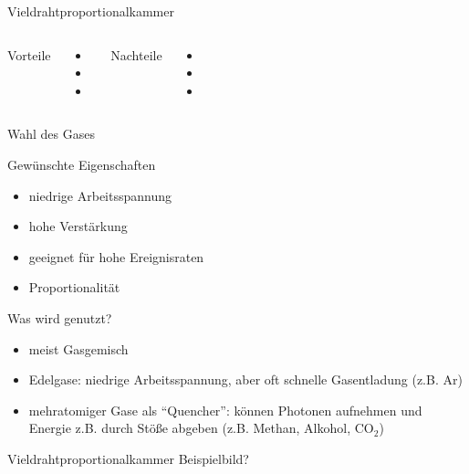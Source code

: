 \begin{frame}{Vieldrahtproportionalkammer}
    \begin{columns}[T]
			Vorteile		
			\begin{itemize}
			  \item 
			  \item
			  \item 
			\end{itemize}	
	    	Nachteile
	    	\begin{itemize}
			  \item 
			  \item 
			  \item 
			\end{itemize}
    \end{columns}
    \vspace{1cm}
\end{frame}

\begin{frame}{Wahl des Gases}
	\begin{block}{Gewünschte Eigenschaften}
		\begin{itemize}
		  \item niedrige Arbeitsspannung
		  \item hohe Verstärkung
		  \item geeignet für hohe Ereignisraten
		  \item Proportionalität
		\end{itemize}
	\end{block}
	\begin{block}{Was wird genutzt?}
		\begin{itemize}
			\item meist Gasgemisch
			\item Edelgase: niedrige Arbeitsspannung, aber oft schnelle Gasentladung (z.B. Ar)
			\item mehratomiger Gase als "`Quencher"': können Photonen aufnehmen und Energie z.B. durch
			Stöße abgeben (z.B. Methan, Alkohol, CO$_2$)
		\end{itemize}
	\end{block}
\end{frame}

\begin{frame}{Vieldrahtproportionalkammer}
    Beispielbild?
\end{frame}
